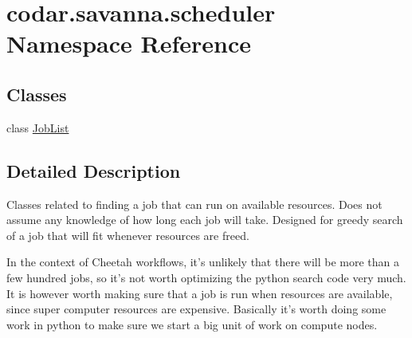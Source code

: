 \hypertarget{namespacecodar_1_1savanna_1_1scheduler}{}\section{codar.\+savanna.\+scheduler Namespace Reference}
\label{namespacecodar_1_1savanna_1_1scheduler}
\subsection*{Classes}
\begin{DoxyCompactItemize}
\item 
class \hyperlink{classcodar_1_1savanna_1_1scheduler_1_1_job_list}{Job\+List}
\end{DoxyCompactItemize}


\subsection{Detailed Description}
\begin{DoxyVerb}Classes related to finding a job that can run on available resources. Does
not assume any knowledge of how long each job will take. Designed for greedy
search of a job that will fit whenever resources are freed.

In the context of Cheetah workflows, it's unlikely that there will be more than
a few hundred jobs, so it's not worth optimizing the python search code very
much. It is however worth making sure that a job is run when resources are
available, since super computer resources are expensive. Basically it's worth
doing some work in python to make sure we start a big unit of work on compute
nodes.
\end{DoxyVerb}
 